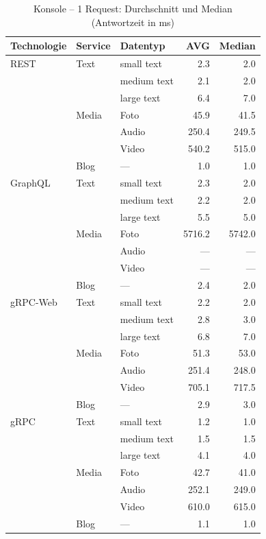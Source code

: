 \begin{table}[h]
	\centering
	\caption{Konsole – 1 Request: Durchschnitt und Median (Antwortzeit in ms)}
	\label{tab:console-1req}
	\renewcommand{\arraystretch}{1.1}
	\begin{tabular}{|l|l|l|r|r|}
		\hline
		\textbf{Technologie} & \textbf{Service} & \textbf{Datentyp} & \textbf{AVG} & \textbf{Median} \\
		\hline
		REST & Text  & small text  & 2.3 & 2.0 \\
		&       & medium text & 2.1 & 2.0 \\
		&       & large text  & 6.4 & 7.0 \\
		& Media & Foto        & 45.9 & 41.5 \\
		&       & Audio       & 250.4 & 249.5 \\
		&       & Video       & 540.2 & 515.0 \\
		& Blog  & —           & 1.0 & 1.0 \\
		\hline
		GraphQL & Text  & small text  & 2.3 & 2.0 \\
		&       & medium text & 2.2 & 2.0 \\
		&       & large text  & 5.5 & 5.0 \\
		& Media & Foto        & 5716.2 & 5742.0 \\
		&       & Audio       & — & — \\
		&       & Video       & — & — \\
		& Blog  & —           & 2.4 & 2.0 \\
		\hline
		gRPC-Web & Text  & small text  & 2.2 & 2.0 \\
		&       & medium text & 2.8 & 3.0 \\
		&       & large text  & 6.8 & 7.0 \\
		& Media & Foto        & 51.3 & 53.0 \\
		&       & Audio       & 251.4 & 248.0 \\
		&       & Video       & 705.1 & 717.5 \\
		& Blog  & —           & 2.9 & 3.0 \\
		\hline
		gRPC & Text  & small text  & 1.2 & 1.0 \\
		&       & medium text & 1.5 & 1.5 \\
		&       & large text  & 4.1 & 4.0 \\
		& Media & Foto        & 42.7 & 41.0 \\
		&       & Audio       & 252.1 & 249.0 \\
		&       & Video       & 610.0 & 615.0 \\
		& Blog  & —           & 1.1 & 1.0 \\
		\hline
	\end{tabular}
\end{table}


